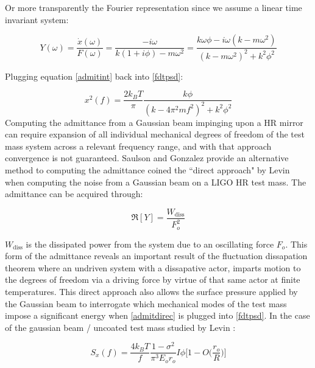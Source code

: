 {\noindent Or more transparently the Fourier representation since we assume a linear time invariant system:

\begin{equation}\label{admitint}
Y(\omega) = \frac{\dot{x}(\omega)}{F(\omega)} = \frac{-i\omega}{k(1+i\phi) - m\omega^2} = \frac{k \omega \phi - i \omega (k - m \omega^2)}{(k-m\omega^2)^2 +k^2 \phi^2}
\end{equation}

\noindent Plugging equation \ref{admitint} back into \ref{fdtpsd}:

\begin{equation}
x^2 (f)  = \frac{2k_B T}{\pi}\frac{k\phi}{(k-4\pi^2 m f^2)^2 + k^2 \phi^2}
\end{equation}
Computing the admittance from a Gaussian beam impinging upon a HR mirror can require expansion of all individual mechanical degrees of freedom of the test mass system across a relevant frequency range, and with that approach convergence is not guaranteed. Saulson and Gonzalez provide an alternative method to computing the admittance coined the ``direct approach" by Levin when computing the noise from a Gaussian beam on a LIGO HR test mass. The admittance can be acquired through:

\begin{equation}\label{admitdirec}
\Re[Y] = \frac{W_\mathrm{diss}}{F_o^2}
\end{equation}

\noindent $W_\mathrm{diss}$ is the dissipated power from the system due to an oscillating force $F_o$. This form of the admittance reveals an important result of the fluctuation dissapation theorem where an undriven system with a dissapative actor, imparts motion to the degrees of freedom via a driving force by virtue of that same actor at finite temperatures. This direct approach also allows the surface pressure applied by the Gaussian beam to interrogate which mechanical modes of the test mass impose a significant energy when \ref{admitdirec} is plugged into \ref{fdtpsd}. In the case of the gaussian beam / uncoated test mass studied by Levin \cite{levin:1998}:

\begin{equation}
S_x(f) = \frac{4 k_B T}{f} \frac{1-\sigma^2}{\pi^3 E_o r_o} I\phi \bigg[1- O\bigg( \frac{r_o}{R} \bigg)\bigg]
\end{equation}


}
